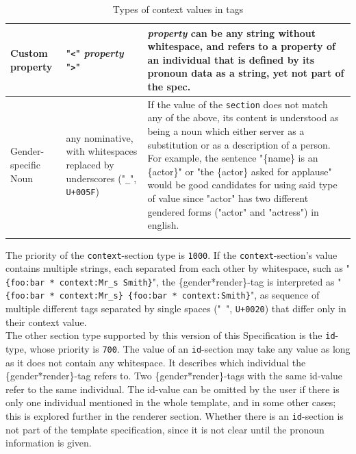 \documentclass{article}
\begin{document}
\begin{flushleft}
\begin{center}
\begin{longtable}{| >{\raggedright\arraybackslash}p{7em} | >{\raggedright\arraybackslash}p{9em} | >{\raggedright\arraybackslash}p{14em} |}
                 \hline
                 \hline
                 Custom property & "\texttt{<}" \emph{property} "\texttt{>}" & \emph{property} can be any string without whitespace, and refers to a property of an individual that is defined by its pronoun data as a string, yet not part of the spec. \\
                 \hline
                 \hline
                 Gender-specific Noun & any nominative, with whitespaces replaced by underscores ("\texttt{\_}", \texttt{U+005F}) & If the value of the \texttt{section} does not match any of the above, its content is understood as being a noun which either server as a substitution or as a description of a person.
                 For example, the sentence "\{name\} is an \{actor\}" or "the \{actor\} asked for applause" would be good candidates for using said type of value since "actor" has two different gendered forms ("actor" and "actress") in english. \\
                 \hline
                \caption{Types of context values in tags}
            \end{longtable}
        \end{center}
    \end{flushleft}

    The priority of the \texttt{context}-section type is \texttt{1000}.
    If the \texttt{context}-section's value contains multiple strings, each separated from each other by whitespace, such as "\texttt{\{foo:bar * context:Mr\_s Smith\}}", the \{gender*render\}-tag is interpreted as "\texttt{\{foo:bar * context:Mr\_s\} \{foo:bar * context:Smith\}}", as sequence of multiple different tags separated by single spaces ("\texttt{ }", \texttt{U+0020}) that differ only in their context value. \\

    The other section type supported by this version of this Specification is the \texttt{id}-type, whose priority is \texttt{700}.
    The value of an \texttt{id}-section may take any value as long as it does not contain any whitespace.
    It describes which individual the \{gender*render\}-tag refers to.
    Two \{gender*render\}-tags with the same id-value refer to the same individual.
    The id-value can be omitted by the user if there is only one individual mentioned in the whole template, and in some other cases;
    this is explored further in the renderer section.
    Whether there is an \texttt{id}-section is not part of the template specification, since it is not clear until the pronoun information is given.\\
\end{document}
